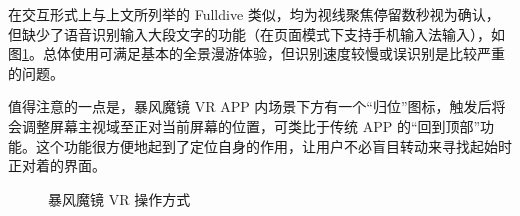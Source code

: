 在交互形式上与上文所列举的 Fulldive 类似，均为视线聚焦停留数秒视为确认，但缺少了语音识别输入大段文字的功能（在页面模式下支持手机输入法输入），如图\ref{fig:storm}。总体使用可满足基本的全景漫游体验，但识别速度较慢或误识别是比较严重的问题。

值得注意的一点是，暴风魔镜 VR APP 内场景下方有一个“归位”图标，触发后将会调整屏幕主视域至正对当前屏幕的位置，可类比于传统 APP 的“回到顶部”功能。这个功能很方便地起到了定位自身的作用，让用户不必盲目转动来寻找起始时正对着的界面。


\begin{figure}[htp]
\centering
{}
\caption{暴风魔镜 VR 操作方式}
\label{fig:storm}
\end{figure}